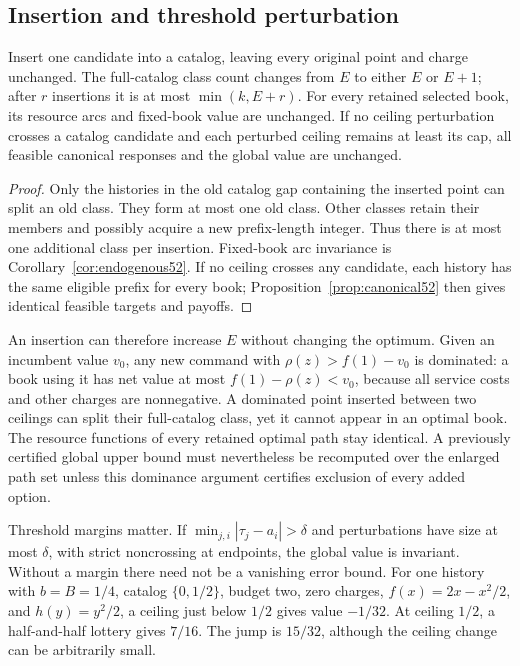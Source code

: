 \subsection{Insertion and threshold perturbation}
\begin{proposition}\label{prop:stability52}
Insert one candidate into a catalog, leaving every original point and charge unchanged. The full-catalog class count changes from $E$ to either $E$ or $E+1$; after $r$ insertions it is at most $\min(k,E+r)$. For every retained selected book, its resource arcs and fixed-book value are unchanged. If no ceiling perturbation crosses a catalog candidate and each perturbed ceiling remains at least its cap, all feasible canonical responses and the global value are unchanged.
\end{proposition}
\begin{proof}
Only the histories in the old catalog gap containing the inserted point can split an old class. They form at most one old class. Other classes retain their members and possibly acquire a new prefix-length integer. Thus there is at most one additional class per insertion. Fixed-book arc invariance is Corollary~\ref{cor:endogenous52}. If no ceiling crosses any candidate, each history has the same eligible prefix for every book; Proposition~\ref{prop:canonical52} then gives identical feasible targets and payoffs.
\end{proof}

An insertion can therefore increase $E$ without changing the optimum. Given an incumbent value $v_0$, any new command with $\rho(z)>f(1)-v_0$ is dominated: a book using it has net value at most $f(1)-\rho(z)<v_0$, because all service costs and other charges are nonnegative. A dominated point inserted between two ceilings can split their full-catalog class, yet it cannot appear in an optimal book. The resource functions of every retained optimal path stay identical. A previously certified global upper bound must nevertheless be recomputed over the enlarged path set unless this dominance argument certifies exclusion of every added option.

Threshold margins matter. If $\min_{j,i}|\tau_j-a_i|>\delta$ and perturbations have size at most $\delta$, with strict noncrossing at endpoints, the global value is invariant. Without a margin there need not be a vanishing error bound. For one history with $b=B=1/4$, catalog $\{0,1/2\}$, budget two, zero charges, $f(x)=2x-x^2/2$, and $h(y)=y^2/2$, a ceiling just below $1/2$ gives value $-1/32$. At ceiling $1/2$, a half-and-half lottery gives $7/16$. The jump is $15/32$, although the ceiling change can be arbitrarily small.

